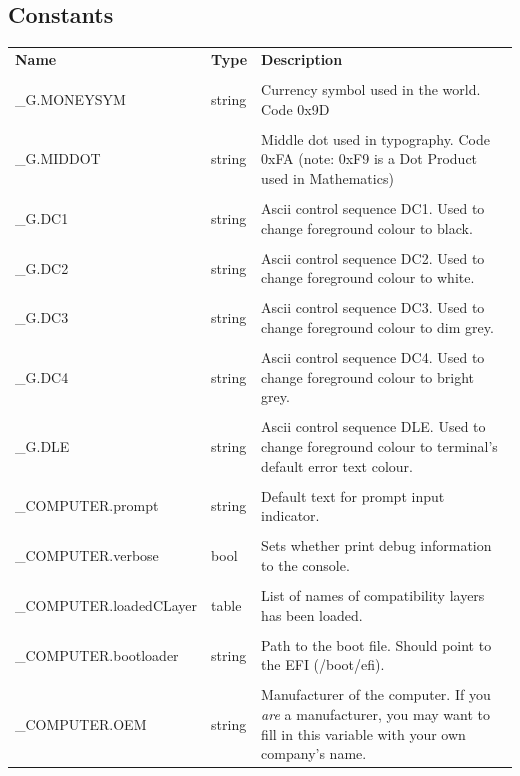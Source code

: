 \documentclass[10pt, stock]{memoir}
\newcommand{\unemph}[1]{\textcolor{brightgrey}{#1}}
\begin{document}
\subsection{Constants}

\begin{tabularx}{\textwidth}{l l X}
	\textbf{\large Name} & \textbf{\large Type} & \textbf{\large Description}
	\\ \\
	\endhead
	\unemph{\_G.}MONEYSYM & string & Currency symbol used in the world. Code 0x9D
	\\ \\
	\unemph{\_G.}MIDDOT & string & Middle dot used in typography. Code 0xFA (note: 0xF9 is a Dot Product used in Mathematics)
	\\ \\
	\unemph{\_G.}DC1 & string & Ascii control sequence DC1. Used to change foreground colour to black.
	\\ \\
	\unemph{\_G.}DC2 & string & Ascii control sequence DC2. Used to change foreground colour to white.
	\\ \\
	\unemph{\_G.}DC3 & string & Ascii control sequence DC3. Used to change foreground colour to dim grey.
	\\ \\
	\unemph{\_G.}DC4 & string & Ascii control sequence DC4. Used to change foreground colour to bright grey.
	\\ \\
	\unemph{\_G.}DLE & string & Ascii control sequence DLE. Used to change foreground colour to terminal's default error text colour.
	\\ \\
	\_COMPUTER.prompt & string & Default text for prompt input indicator.
	\\ \\
	\_COMPUTER.verbose & bool & Sets whether print debug information to the console.
	\\ \\
	\_COMPUTER.loadedCLayer & table & List of names of compatibility layers has been loaded.
	\\ \\
	\_COMPUTER.bootloader & string & Path to the boot file. Should point to the EFI (/boot/efi).
	\\ \\
	\_COMPUTER.OEM & string & Manufacturer of the computer. If you \emph{are} a manufacturer, you may want to fill in this variable with your own company's name.
\end{tabularx}
\end{document}
